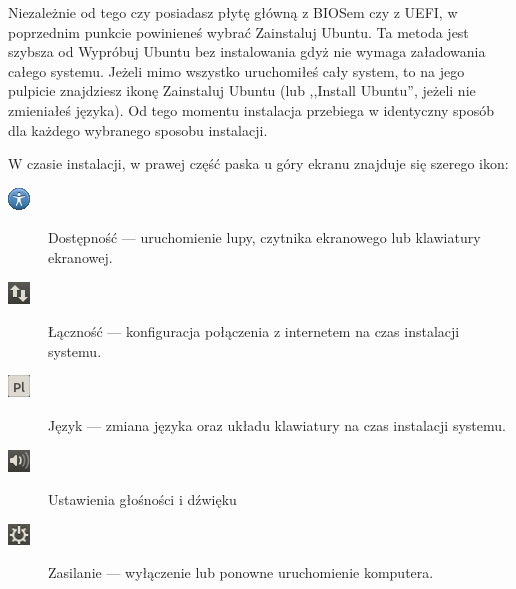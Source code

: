 Niezależnie od tego czy posiadasz płytę główną z BIOSem czy z UEFI, w poprzednim punkcie powinieneś wybrać \textcolor{ubuntu_orange}{Zainstaluj Ubuntu}. Ta metoda jest szybsza od \textcolor{ubuntu_orange}{Wypróbuj Ubuntu bez instalowania} gdyż nie wymaga załadowania całego systemu. Jeżeli mimo wszystko uruchomiłeś cały system, to na jego pulpicie znajdziesz ikonę \textcolor{ubuntu_orange}{Zainstaluj Ubuntu} (lub ,,Install Ubuntu'', jeżeli nie zmieniałeś języka). Od tego momentu instalacja przebiega w identyczny sposób dla każdego wybranego sposobu instalacji.

W czasie instalacji, w prawej część paska u góry ekranu znajduje się szerego ikon:
\begin{description}
\item[\includegraphics{images/ikony_dostempnosc.png}]\textcolor{ubuntu_orange}{Dostępność} --- uruchomienie lupy, czytnika ekranowego lub klawiatury ekranowej.
\item[\includegraphics{images/ikony_internet.png}]\textcolor{ubuntu_orange}{Łączność} --- konfiguracja połączenia z internetem na czas instalacji systemu.
\item[\includegraphics{images/ikony_jezyk.png}]\textcolor{ubuntu_orange}{Język} --- zmiana języka oraz układu klawiatury na czas instalacji systemu.
\item[\includegraphics{images/ikony_dzwiek.png}]\textcolor{ubuntu_orange}{Ustawienia głośności i dźwięku}
\item[\includegraphics{images/ikony_zasilanie.png}]\textcolor{ubuntu_orange}{Zasilanie} --- wyłączenie lub ponowne uruchomienie komputera.
\end{description}
\clearpage
